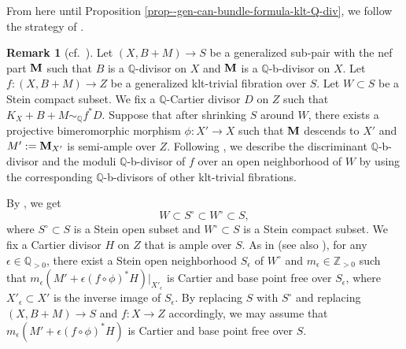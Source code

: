 \documentclass[12pt]{amsart}
\theoremstyle{definition}
\newtheorem{rem}[thm]{Remark}
\begin{document}
From here until Proposition \ref{prop--gen-can-bundle-formula-klt-Q-div}, we follow the strategy of \cite{filipazzi-gen-can-bundle-formula}. 

\begin{rem}[cf.~{\cite[Remark 4.8]{filipazzi-gen-can-bundle-formula}}]\label{rem--description-div-gen-can-bundle-formula}
Let $(X,B+M) \to S$ be a generalized sub-pair with the nef part $\boldsymbol{\rm M}$ such that  $B$ is a $\mathbb{Q}$-divisor on $X$ and $\boldsymbol{\rm M}$ is a $\mathbb{Q}$-b-divisor on $X$. 
Let $f\colon (X,B+M) \to Z$ be a generalized klt-trivial fibration over $S$. 
Let $W \subset S$ be a Stein compact subset.
We fix a $\mathbb{Q}$-Cartier divisor $D$ on $Z$ such that $K_{X}+B+M \sim_{\mathbb{Q}}f^{*}D$. 
Suppose that after shrinking $S$ around $W$, there exists a projective bimeromorphic morphism $\phi \colon X' \to X$ such that $\boldsymbol{\rm M}$ descends to $X'$ and $M':=\boldsymbol{\rm M}_{X'}$ is semi-ample over $Z$. 
Following \cite[Remark 4.8]{filipazzi-gen-can-bundle-formula}, we describe the discriminant $\mathbb{Q}$-b-divisor and the moduli $\mathbb{Q}$-b-divisor of $f$ over an open neighborhood of $W$ by using the corresponding $\mathbb{Q}$-b-divisors of other klt-trivial fibrations. 

By \cite[Lemma 2.16]{fujino-analytic-bchm}, we get
$$W \subset S^{\circ} \subset W^{\circ} \subset S,$$
where $S^{\circ}\subset S$ is a Stein open subset and $W^{\circ}\subset S$ is a Stein compact subset. 
We fix a Cartier divisor $H$ on $Z$ that is ample over $S$. 
As in \cite[Proof of Proposition 4.7]{filipazzi-gen-can-bundle-formula} (see also \cite[Theorem 4.10]{fujino-analytic-bchm}), for any $\epsilon \in \mathbb{Q}_{>0}$, there exist a Stein open neighborhood $S_{\epsilon}$ of $W^{\circ}$ and $m_{\epsilon} \in \mathbb{Z}_{>0}$ such that $m_{\epsilon}(M'+\epsilon (f \circ \phi)^{*}H)|_{X'_{\epsilon}}$ is Cartier and base point free over $S_{\epsilon}$, where $X'_{\epsilon} \subset X'$ is the inverse image of $S_{\epsilon}$. 
By replacing $S$ with $S^{\circ}$ and replacing $(X,B+M) \to S$ and $f \colon X \to Z$ accordingly, we may assume that $m_{\epsilon}(M'+\epsilon (f \circ \phi)^{*}H)$ is Cartier and base point free over $S$. 


\end{rem}
\end{document}
